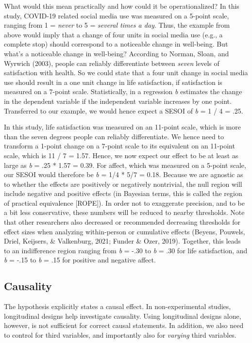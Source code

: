 \documentclass[
  english,
  man,mask,floatsintext]{apa6}
\begin{document}
What would this mean practically and how could it be operationalized?
In this study, COVID-19 related social media use was measured on a 5-point scale, ranging from 1 = \emph{never} to 5 = \emph{several times a day}.
Thus, the example from above would imply that a change of four units in social media use (e.g., a complete stop) should correspond to a noticeable change in well-being.
But what's a noticeable change in well-being?
According to Norman, Sloan, and Wyrwich (2003), people can reliably differentiate between \emph{seven} levels of satisfaction with health.
So we could state that a four unit change in social media use should result in a one unit change in life satisfaction, if satisfaction is measured on a 7-point scale.
Statistically, in a regression \emph{b} estimates the change in the dependent variable if the independent variable increases by one point.
Transferred to our example, we would hence expect a SESOI of \emph{b} = 1 / 4 = .25.

In this study, life satisfaction was measured on an 11-point scale, which is more than the seven degrees people can reliably differentiate.
We hence need to transform a 1-point change on a 7-point scale to its equivalent on an 11-point scale, which is 11 / 7 = 1.57.
Hence, we now expect our effect to be at least as large as \emph{b} = .25 * 1.57 = 0.39.
For affect, which was measured on a 5-point scale, our SESOI would therefore be \emph{b} = 1/4 * 5/7 = 0.18.
Because we are agnostic as to whether the effects are positively or negatively nontrivial, the null region will include negative and positive effects (in Bayesian terms, this is called the region of practical equivalence {[}ROPE{]}).
In order not to exaggerate precision, and to be a bit less conservative, these numbers will be reduced to nearby thresholds.
Note that other researchers also decreased or recommended decreasing thresholds for effect sizes when analyzing within-person or cumulative effects (Beyens, Pouwels, Driel, Keijsers, \& Valkenburg, 2021; Funder \& Ozer, 2019).
Together, this leads to an indifference region ranging from \emph{b} = -.30 to \emph{b} = .30 for life satisfaction, and \emph{b} = -.15 to \emph{b} = .15 for positive and negative affect.

\hypertarget{causality}{%
\subsection{Causality}\label{causality}}

The hypothesis explicitly states a causal effect.
In non-experimental studies, longitudinal designs help investigate causality.
Using longitudinal designs alone, however, is not sufficient for correct causal statements.
In addition, we also need to control for third variables, and importantly also for \emph{varying} third variables.
\end{document}
